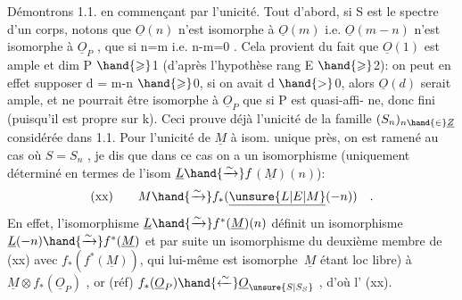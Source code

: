 Démontrons  1.1.  en commençant par l'unicité.  Tout d'abord, si S est
le spectre d'un corps, notons que  $\underline{O}(n)$ n'est isomorphe à $\underline{O}(m)$ i.e.
$\underline{O}(m-n)$  n'est  isomorphe à $\underline{O}_P$ , que si  n=m i.e.  n-m=0 .  Cela provient
du fait que $\underline{O}(1)$ est ample et  dim P $\hand{\geqslant}$1 (d'après l'hypothèse rang E $\hand{\geqslant}$2):
on peut en effet supposer  d = m-n $\hand{\geqslant}$0, si on avait d $\hand{>}$0, alors $\underline{O}(d)$
serait ample, et ne pourrait être isomorphe à  $\underline{O}_P$ que si P est quasi-affi-%
ne, donc fini (puisqu'il est propre sur k).  Ceci prouve déjà  l'unicité
de la famille $(S_n)_{n\hand{\in}\underline{Z}}$  considérée dans 1.1.  Pour l'unicité de $\underline{M}$ à isom.
unique près, on est ramené au cas où  $S=S_n$ , je dis que dans ce cas on a
un isomorphisme  (uniquement déterminé en termes de l'isom  $\underline{L} \hand{\xrightarrow{\sim}} f$$(\underline{M})(n)$):
\[ \text{(xx)} \qquad M \hand{\xrightarrow{\sim}} f_*(\underline{\unsure{L|E|M}}(-n)) \quad . \]
En effet,  l'isomorphisme  $\underline{L} \hand{\xrightarrow{\sim}} f^*(\underline{M})(n)$   définit un isomorphisme
$\underline{L}(-n) \hand{\xrightarrow{\sim}} f^*(\underline{M})$  et par suite un isomorphisme du deuxième membre de (xx)
avec $f_*(f^*(\underline{M}))$, qui lui-même est isomorphe \,$\underline{M}$ étant loc libre) à
$\underline{M}\otimes f_*(\underline{O}_P)$ , or  (réf)  $f_*(\underline{O}_P) \hand{\xleftarrow{\sim}} \underline{O}_{\unsure{S|S_S}}$ ,  d'où l' (xx).

